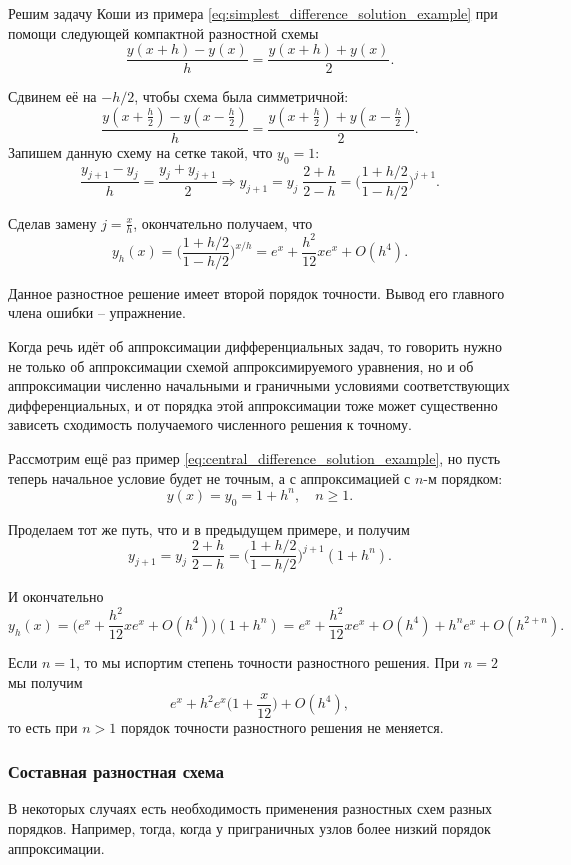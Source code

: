 \documentclass[../main.tex]{subfile}
\begin{document}
\begin{example}
\label{eq:central_difference_solution_example}
	Решим задачу Коши из примера
	\eqref{eq:simplest_difference_solution_example} при помощи следующей
	компактной разностной схемы
	\[\frac{y(x+h)-y(x)}{h}=\frac{y(x+h)+y(x)}{2}.\]

	Сдвинем её на $-h/2$, чтобы схема была симметричной:
	\[\frac{y(x+\frac{h}{2})-y(x-\frac{h}{2})}{h}=\frac{y(x+\frac{h}{2})+
	y(x-\frac{h}{2})}{2}.\]
	Запишем данную схему на сетке такой, что $y_0=1$:
	\[\frac{y_{j+1}-y_j}{h}=\frac{y_j+y_{j+1}}{2}\Rightarrow
	y_{j+1}=y_j\;\frac{2+h}{2-h}=\Big(\frac{1+h/2}{1-h/2}\Big)^{j+1}.\]

	Сделав замену $j=\frac{x}{h}$, окончательно получаем, что
	\[y_h(x)=\Big(\frac{1+h/2}{1-h/2}\Big)^{x/h}=e^x+\frac{h^2}{12}xe^x+
	O(h^4).\]

	Данное разностное решение имеет второй порядок точности. Вывод
	его главного члена ошибки -- упражнение.
\end{example}

Когда речь идёт об аппроксимации дифференциальных задач, то говорить нужно не
только об аппроксимации схемой аппроксимируемого уравнения, но и об
аппроксимации численно начальными и граничными условиями соответствующих
дифференциальных, и от порядка этой аппроксимации тоже может существенно
зависеть сходимость получаемого численного решения к точному.

\begin{example}\label{eq:spoiled_ds_example}
	Рассмотрим ещё раз пример
	\eqref{eq:central_difference_solution_example}, но пусть теперь
	начальное условие будет не точным, а с аппроксимацией с $n$-м
	порядком:
	\[y(x)=y_0=1+h^n,\quad n\ge 1.\]

	Проделаем тот же путь, что и в предыдущем примере, и получим
	\[y_{j+1}=y_j\;\frac{2+h}{2-h}=\Big(\frac{1+h/2}{1-h/2}\Big)
	^{j+1}(1+h^n).\]

	И окончательно
	\[y_h(x)=\big(e^x+\frac{h^2}{12}xe^x+O(h^4)\big)(1+h^n)=e^x+
	\frac{h^2}{12}xe^x+O(h^4)+h^ne^x+O(h^{2+n}).\]

	Если $n=1$, то мы испортим степень точности разностного решения.
	При $n=2$ мы получим
	\[e^x+h^2e^x\big(1+\frac{x}{12}\big)+O(h^4),\]
	то есть при $n>1$ порядок точности разностного решения не меняется.
\end{example}

\subsubsection{Составная разностная схема}
В некоторых случаях есть необходимость применения разностных схем разных
порядков. Например, тогда, когда у приграничных узлов более низкий порядок
аппроксимации.
\end{document}
